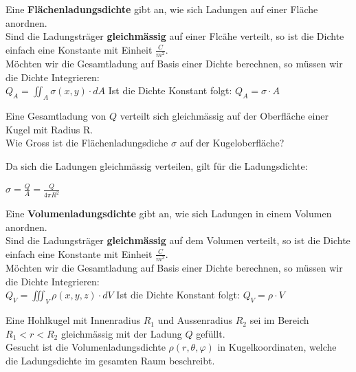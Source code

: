 \beginip
Eine \textbf{Flächenladungsdichte} gibt an, wie sich Ladungen auf einer Fläche anordnen. \\
Sind die Ladungsträger \textbf{gleichmässig} auf einer Flcähe verteilt, so ist die Dichte einfach eine Konstante mit Einheit $\frac{C}{m^2}$. \\
Möchten wir die Gesamtladung auf Basis einer Dichte berechnen, so müssen wir die Dichte Integrieren: \\
\formulaBegin
	$\displaystyle Q_{A} = \iint_A \sigma (x,y) \cdot dA$
\formulaEnd
Ist die Dichte Konstant folgt:
\formulaBegin
	$\displaystyle Q_{A} = \sigma \cdot A$
\formulaEnd
\iend







\beginbsp
	Eine Gesamtladung von $Q$ verteilt sich gleichmässig auf der Oberfläche einer Kugel mit Radius R. \\
	Wie Gross ist die Flächenladungsdiche $\sigma$ auf der Kugeloberfläche?
\iend


\beginbsp
	Da sich die Ladungen gleichmässig verteilen, gilt für die Ladungsdichte:
	\begin{center}
		$\displaystyle \sigma = \frac{Q}{A} = \frac{Q}{4\pi R^2}$
	\end{center}
\iend








\beginip
Eine \textbf{Volumenladungsdichte} gibt an, wie sich Ladungen in einem Volumen anordnen. \\
Sind die Ladungsträger \textbf{gleichmässig} auf dem Volumen verteilt, so ist die Dichte einfach eine Konstante mit Einheit $\frac{C}{m^3}$. \\
Möchten wir die Gesamtladung auf Basis einer Dichte berechnen, so müssen wir die Dichte Integrieren: \\
\formulaBegin
	$\displaystyle Q_{V} = \iiint_V \rho (x,y,z) \cdot dV$
\formulaEnd
Ist die Dichte Konstant folgt:
\formulaBegin
	$\displaystyle Q_{V} = \rho \cdot V$
\formulaEnd
\iend




\beginbsp
Eine Hohlkugel mit Innenradius $R_1$ und Aussenradius $R_2$ sei im Bereich $ R_1 < r < R_2$ gleichmässig mit der Ladung $Q$ gefüllt. \\
Gesucht ist die Volumenladungsdichte $\rho(r,\theta,\varphi)$ in Kugelkoordinaten, welche die Ladungsdichte im gesamten Raum beschreibt.
\iend


